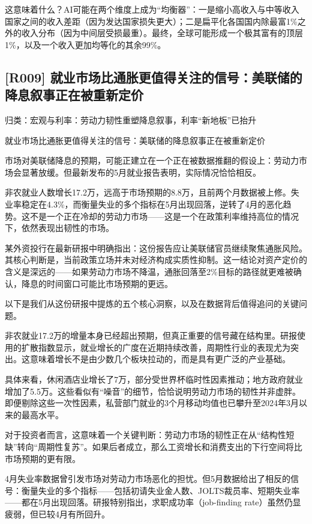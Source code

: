 \documentclass[11pt]{ctexart}
\begin{document}
这意味着什么？AI可能在两个维度上成为“均衡器”：一是缩小高收入与中等收入国家之间的收入差距（因为发达国家损失更大）；二是扁平化各国国内除最富1\%之外的收入分布（因为中间层受损最重）。最终，全球可能形成一个极其富有的顶层1\%，以及一个收入更加均等化的其余99\%。

\subsection{[R009] 就业市场比通胀更值得关注的信号：美联储的降息叙事正在被重新定价}
{\small\color{refgray}归类：宏观与利率：劳动力韧性重塑降息叙事，利率“新地板”已抬升}

就业市场比通胀更值得关注的信号：美联储的降息叙事正在被重新定价

市场对美联储降息的预期，可能正建立在一个正在被数据推翻的假设上：劳动力市场会显著放缓。但最新发布的5月就业报告表明，实际情况恰恰相反。

非农就业人数增长17.2万，远高于市场预期的8.8万，且前两个月数据被上修。失业率稳定在4.3\%，而衡量失业的多个指标在5月出现回落，逆转了4月的恶化趋势。这不是一个正在冷却的劳动力市场——这是一个在政策利率维持高位的情况下，依然表现出韧性的市场。

某外资投行在最新研报中明确指出：这份报告应让美联储官员继续聚焦通胀风险。其核心判断是，当前政策立场并未对经济构成实质性抑制。这一结论对资产定价的含义是深远的——如果劳动力市场不降温，通胀回落至2\%目标的路径就更难被确认，降息的时间窗口可能比市场预期的更远。

以下是我们从这份研报中提炼的五个核心洞察，以及在数据背后值得追问的关键问题。

非农就业17.2万的增量本身已经超出预期，但真正重要的信号藏在结构里。研报使用的扩散指数显示，就业增长的广度在近期持续改善，周期性行业的表现尤为突出。这意味着增长不是由少数几个板块拉动的，而是具有更广泛的产业基础。

具体来看，休闲酒店业增长了7万，部分受世界杯临时性因素推动；地方政府就业增加了5.5万。这些看似有“噪音”的细节，恰恰说明劳动力市场的韧性并非虚胖。即便剔除这些一次性因素，私营部门就业的3个月移动均值也已攀升至2024年3月以来的最高水平。

对于投资者而言，这意味着一个关键判断：劳动力市场的韧性正在从“结构性短缺”转向“周期性复苏”。如果后者成立，那么工资增长和消费支出的下行空间将比市场预期的更有限。

4月失业率数据曾引发市场对劳动力市场恶化的担忧。但5月数据给出了相反的信号：衡量失业的多个指标——包括初请失业金人数、JOLTS裁员率、短期失业率——都在5月出现回落。研报特别指出，求职成功率（job-finding rate）虽然仍显疲弱，但已较4月有所回升。
\end{document}
